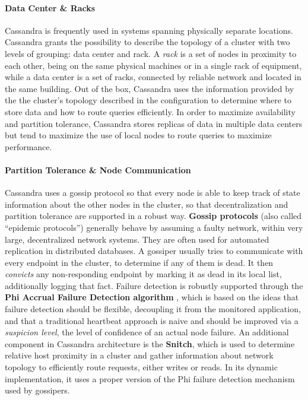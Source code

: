 \paragraph{Data Center \& Racks} Cassandra is frequently used in systems spanning physically separate locations. Cassandra grants the possibility to describe the topology of a cluster with two levels of grouping: data center and rack. A \textit{rack} is a set of nodes in proximity to each other, being on the same physical machines or in a single rack of equipment, while a data center is a set of racks, connected by reliable network and located in the same building. Out of the box, Cassandra uses the information provided by the the cluster’s topology described in the configuration to determine where to store data and how to route queries efficiently. In order to maximize availability and partition tolerance, Cassandra stores replicas of data in multiple data centers but tend to maximize the use of local nodes to route queries to maximize performance.

\paragraph{Partition Tolerance \& Node Communication} Cassandra uses a gossip protocol so that every node is able to keep track of state information about the other nodes in the cluster, so that decentralization and partition tolerance are supported in a robust way. \textbf{Gossip protocols} (also called “epidemic protocols”) generally behave by assuming a faulty network, within very large, decentralized network systems. They are often used for automated  replication in distributed databases.
A gossiper usually tries to communicate with every endpoint in the cluster, to determine if any of them is dead. It then \textit{convicts} any non-responding endpoint by marking it as dead in its local list, additionally logging that fact.
Failure detection is robustly supported through the \textbf{Phi Accrual Failure Detection algorithm} \cite{hayashibara2004spl}, which is based on the ideas that failure detection should be flexible, decoupling it from the monitored application, and that a traditional heartbeat approach is naive and should be improved via a \textit{suspicion level}, the level of confidence of an actual node failure.
An additional component in Cassandra architecture is the \textbf{Snitch}, which is used to determine relative host proximity in a cluster and gather information about network topology to efficiently route requests, either writes or reads. In its dynamic implementation, it uses a proper version of the Phi failure detection mechanism used by gossipers.

